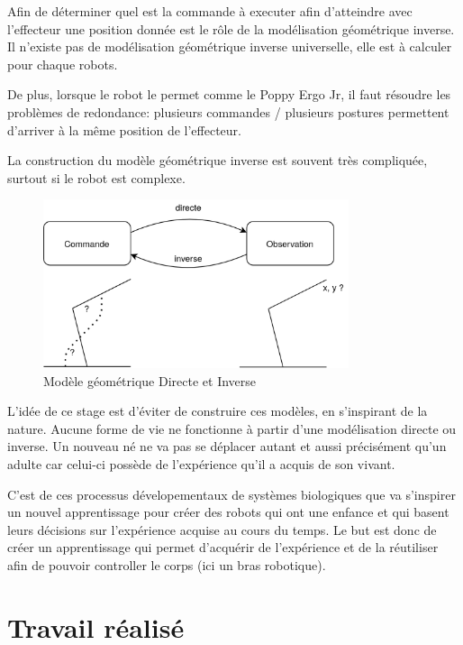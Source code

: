 \documentclass[11pt,french]{report}
\begin{document}
\phantom{INVISIBLE LINE}

Afin de déterminer quel est la commande à executer afin d'atteindre avec l'effecteur une position donnée est le rôle de la modélisation géométrique inverse.
Il n'existe pas de modélisation géométrique inverse universelle, elle est à calculer pour chaque robots.

De plus, lorsque le robot le permet comme le Poppy Ergo Jr, il faut résoudre les problèmes de redondance: plusieurs commandes / plusieurs postures permettent d'arriver à la même position de l'effecteur.

La construction du modèle géométrique inverse est souvent très compliquée, surtout si le robot est complexe.


\begin{figure}
    \centering
    \includegraphics[height=140pt]{Modelisation_geometrique_diagram} 
    \caption{Modèle géométrique Directe et Inverse}
    \label{fig:SchemaModelisation}
\end{figure}

\phantom{INVISIBLE LINE}

L'idée de ce stage est d'éviter de construire ces modèles, en s'inspirant de la nature.
Aucune forme de vie ne fonctionne à partir d'une modélisation directe ou inverse.
Un nouveau né ne va pas se déplacer autant et aussi précisément qu'un adulte car celui-ci possède de l'expérience qu'il a acquis de son vivant.

C'est de ces processus dévelopementaux de systèmes biologiques que va s'inspirer un nouvel apprentissage pour créer des robots qui ont une enfance et qui basent leurs décisions sur l'expérience acquise au cours du temps.
Le but est donc de créer un apprentissage qui permet d'acquérir de l'expérience et de la réutiliser afin de pouvoir controller le corps (ici un bras robotique).

\chapter{Travail réalisé}
\end{document}
